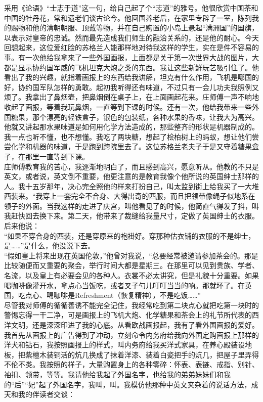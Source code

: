采用《论语》“士志于道”这一句，给自己起了个“志道”的雅号。他很欣赏中国茶和中国的牡丹花，常和遗老们谈古论今。他回国养老后，在家里专辟了一室，陈列我的赐物和他的清朝朝服、顶戴等物，并在自己购置的小岛上悬起“满洲国”的国旗，以表示对皇帝的忠诚。然而最先造成我们师生的融洽关系的，还是他的耐心。今天回想起来，这位爱红脸的苏格兰人能那样地对待我这样的学生，实在是件不容易的事。有一次他给我拿来了一些外国画报，上面都是关于第一次世界大战的图片，大都是显示协约国军威的飞机坦克大炮之类的东西。我让这些新鲜玩艺吸引住了。他看出了我的兴趣，就指着画报上的东西给我讲解，坦克有什么作用，飞机是哪国的好，协约国军队怎样的勇敢。起初我听得还有味道，不过只有一会儿功夫我照例又烦了。我拿出了鼻烟壶，把鼻烟倒在桌子上，在上面画起花来。庄师傅一声不响地收起了画报，等着我玩鼻烟，一直等到下课的时候。还有一次，他给我带来一些外国糖果，那个漂亮的轻铁盒子，银色的包装纸，各种水果的香味，让我大为高兴。他就又讲起那水果味道是如何用化学方法造成的，那些整齐的形状是机器制成的。我一点也听不懂，也不想懂。我吃了两块糖，想起了桧柏树上的蚂蚁，想让他们尝尝化学和机器的味道，于是跑到跨院里去了。这位苏格兰老夫子于是又守着糖果盒子，在那里一直等到下课。\\

庄师傅教育我的苦心，我逐渐地明白了，而且感到高兴，愿意听从。他教的不只是英文，或者说，英文倒不重要，他更注意的是教育我像个他所说的英国绅士那样的人。我十五岁那年，决心完全照他的样来打扮自己，叫太监到街上给我买了一大堆西装来。“我穿上一套完全不合身、大得出奇的西服，而且把领带像绳子似地系在领子的外面。当我这样的走进了庆宫，叫他看见了的时候，他简直气得发了抖，叫我赶快回去换下来。第二天，他带来了裁缝给我量尺寸，定做了英国绅士的衣服。后来他说：\\

“如果不穿合身的西装，还是穿原来的袍褂好。穿那种估衣铺的衣服的不是绅士，是……”是什么，他没说下去。\\

“假如皇上将来出现在英国伦敦，”他曾对我说，“总要经常被邀请参加茶会的。那是比较随便而又重要的聚会，举行时间大都是星期三。在那里可以见到贵族、学者、名流，以及皇上有必要会见的各种人。衣裳不必太讲究，但是礼貌十分重要。如果喝咖啡像灌开水，拿点心当饭吃，或者叉子勺儿叮叮当当的响。那就坏了。在英国，吃点心、喝咖啡是Refreshment（恢复精神），不是吃饭……”\\

尽管我对师傅的循循善诱不能完全记住，我经常吃到第二块点心就把吃第一块时的警惕忘得一干二净，可是画报上的飞机大炮、化学糖果和茶会上的礼节所代表的西洋文明，还是深深印进了我的心底。从看欧战画报起，我有了看外国画报的爱好。我首先从画报上的广告得到了冲动，立刻命令内务府给我向外国定购画报上那样的洋犬和钻石，我按照画报上的样式，叫内务府给我买洋式家具，在养心殿装设地板，把紫檀木装铜活的炕几换成了抹着洋漆、装着白瓷把手的炕几，把屋子里弄得不伦不类。我按照的样子，大量购置身上的各种零碎：怀表、表链、戒指、别针、袖扣、领带，等等。我请他给我起了外国名字，也给我的弟弟妹妹们和我的“后”“妃”起了外国名字，我叫，叫。我模仿他那种中英文夹杂着的说话方法，成天和我的伴读者交谈：\\

